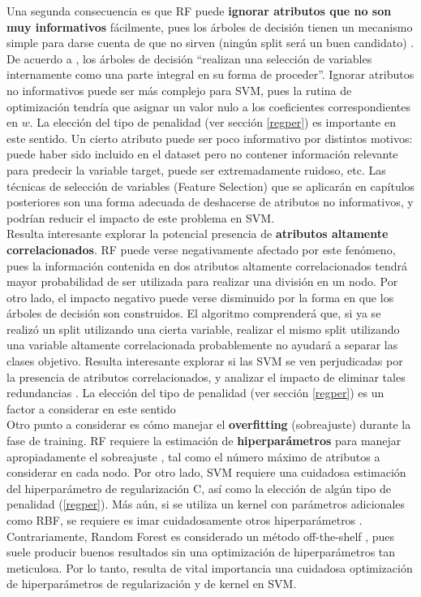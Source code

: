Una segunda consecuencia es que RF puede \textbf{ignorar atributos que no son muy informativos} fácilmente, pues los árboles de decisión tienen un mecanismo simple para darse cuenta de que no sirven (ningún split será un buen candidato) \cite{statisticallearning}. De acuerdo a \cite{statisticallearning}, los árboles de decisión ``realizan una selección de variables internamente como una parte integral en su forma de proceder''. Ignorar atributos no informativos puede ser más complejo para SVM, pues la rutina de optimización tendría que asignar un valor nulo a los coeficientes correspondientes en $w$. La elección del tipo de penalidad (ver sección \ref{regper}) es importante en este sentido. Un cierto atributo puede ser poco informativo por distintos motivos: puede haber sido incluido en el dataset pero no contener información relevante para predecir la variable target, puede ser extremadamente ruidoso, etc.  Las técnicas de selección de variables  (Feature Selection) que se aplicarán en capítulos posteriores son una forma adecuada de deshacerse de atributos no informativos, y podrían reducir el impacto de este problema en SVM. \\

Resulta interesante explorar la potencial presencia de \textbf{atributos altamente correlacionados}. RF puede verse negativamente afectado por este fenómeno, pues la información contenida en dos atributos altamente correlacionados tendrá mayor probabilidad de ser utilizada para realizar una división en un nodo. Por otro lado, el impacto negativo puede verse disminuido por la forma en que los árboles de decisión son construidos. El algoritmo comprenderá que, si ya se realizó un split utilizando una cierta variable, realizar el mismo split utilizando una variable altamente correlacionada probablemente no ayudará a separar las clases objetivo. Resulta interesante explorar si las SVM se ven perjudicadas por la presencia de atributos correlacionados, y analizar el impacto de eliminar tales redundancias \cite{rf_collinearity}. La elección del tipo de penalidad (ver sección \ref{regper}) es un factor a considerar en este sentido\\

Otro punto a considerar es cómo manejar el \textbf{overfitting} (sobreajuste) durante la fase de training. RF requiere la estimación de \textbf{hiperparámetros}  para manejar apropiadamente el sobreajuste \cite{louppe2015understanding}, tal como el número máximo de atributos a considerar en cada nodo. Por otro lado, SVM requiere una cuidadosa estimación del hiperparámetro de regularización C, así como la elección de algún tipo de penalidad (\ref{regper}). Más aún, si se utiliza un kernel con parámetros adicionales como RBF, se requiere es
imar cuidadosamente otros hiperparámetros \cite{svm_practical}. Contrariamente, Random Forest es considerado un método off-the-shelf \cite{offshelf}, pues suele producir buenos resultados sin una optimización de hiperparámetros tan meticulosa. Por lo tanto, resulta de vital importancia una cuidadosa optimización de hiperparámetros de regularización y de kernel en SVM. \\

